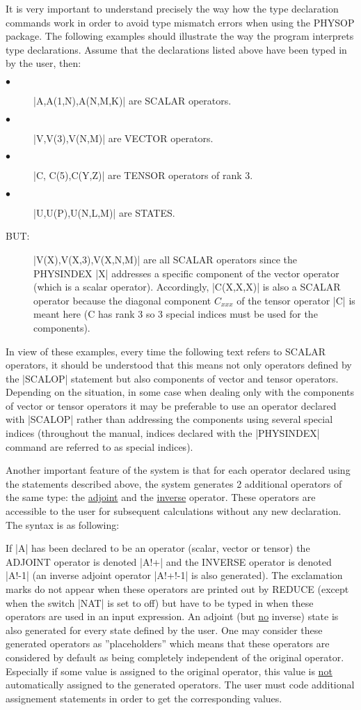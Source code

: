 It is very important to understand precisely the way how the type
declaration commands work in order to avoid type mismatch errors when
using the PHYSOP package. The following examples should illustrate the
way the program interprets type declarations.
Assume that the declarations listed above have
been typed in by the user, then:
\begin{description}
\item[$\bullet$] |A,A(1,N),A(N,M,K)| are SCALAR operators.
\item[$\bullet$] |V,V(3),V(N,M)| are VECTOR operators.
\item[$\bullet$] |C, C(5),C(Y,Z)| are TENSOR operators of
rank 3.
\item[$\bullet$] |U,U(P),U(N,L,M)| are  STATES.
\item[BUT:] |V(X),V(X,3),V(X,N,M)| are all SCALAR operators since the
PHYSINDEX |X|  addresses a specific component of the
vector operator (which is a scalar operator). Accordingly,
|C(X,X,X)| is  also a SCALAR operator because
the diagonal component $C_{xxx}$
of the tensor operator |C| is meant here
(C has rank 3 so 3 special indices must be used for the components).
\end{description}

In view of these examples, every time the following text
refers to SCALAR operators,
it should be understood that this means not only operators defined by
the
|SCALOP| statement but also components of vector and tensor operators.
Depending on the situation, in some case when dealing only with the
components of vector or tensor operators it may be preferable to use
an operator declared with |SCALOP| rather than addressing  the
components using several special indices (throughout the
manual,
indices declared with the |PHYSINDEX| command are referred to as special
indices).

Another important feature of the system  is that
for each operator declared using the statements described above, the
system generates 2 additional operators of the same type:
the \underline{adjoint} and the \underline{inverse} operator.
These operators are accessible to the user for subsequent calculations
without any new declaration.  The syntax is as following:

If |A| has been declared to be an operator (scalar, vector or tensor)
the ADJOINT operator is denoted |A!+| and the  INVERSE
operator is denoted |A!-1| (an inverse adjoint operator |A!+!-1|
is also generated).
The exclamation marks do not appear
when these operators are printed out by REDUCE (except when the switch
|NAT| is set to off)
but have to be typed in when these operators are used in an input
expression.
An adjoint (but \underline{no} inverse)  state  is also
generated  for every state defined by the user.
One may consider these generated operators as ''placeholders'' which
means that these operators are considered by default as
being completely independent of the original operator.
Especially if some value is assigned to the original operator,
this value is \underline{not} automatically assigned to the
generated operators. The user must code additional assignement
statements in order to get the corresponding values.

